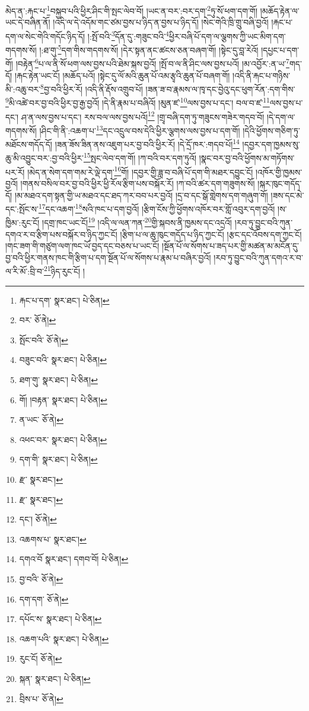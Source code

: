 མེད་ན་:རྐང་པ་\footnote{རྐང་པ་དག་  སྣར་ཐང་།  པེ་ཅིན། }བསྐྱབ་པའི་ཕྱིར་ཤིང་གི་སྤང་ལེབ་བོ། །ཡང་ན་བར་:བར་དག་\footnote{བར་  ཅོ་ནེ། }ཏུ་སོ་ཕག་དག་གོ། །མཆོད་རྟེན་ལ་ཡང་དེ་བཞིན་ནོ། །འདི་ལ་དེ་འདོམ་གང་ཙམ་བྱས་པ་ཉིད་ན་བྱས་པ་ཉིད་དོ། །སེང་གེའི་ཁྲི་གྲུ་བཞི་བྱའོ། །རྐང་པ་དག་ལ་སེང་གེའི་གདོང་ཉིད་དོ། །:སྤོ་བའི་\footnote{སྤོང་བའི་  ཅོ་ནེ། }དོན་དུ་:གཟུང་བའི་\footnote{བཟུང་བའི་  སྣར་ཐང་།  པེ་ཅིན། }ཕྱིར་བཞི་པོ་དག་ལ་ལྕགས་ཀྱི་ཡང་མིག་དག་གདགས་སོ། །:ཐ་གུ་\footnote{ཐག་གུ་  སྣར་ཐང་།  པེ་ཅིན། }དག་གིས་གདགས་སོ། །དེར་སྟན་ནང་ཚངས་ཅན་བཞག་གོ། །སྟེང་དུ་བླ་རེའོ། །དཔྱང་པ་དག་གོ། །བརྟེན་\footnote{གོ། །བརྟན་  སྣར་ཐང་།  པེ་ཅིན། }པ་ལ་ནི་སོ་ཕག་ལས་བྱས་པའི་ཐེམ་སྐས་བྱའོ། །སྤོ་བ་ལ་ནི་ཤིང་ལས་བྱས་པའོ། །མ་འབྱོར་:ན་ཡ་\footnote{ན་ཡང་  ཅོ་ནེ། }གད་དོ། །རྐང་རྟེན་ཡང་ངོ། །མཆོད་པའོ། །སྟེང་དུ་ལོ་མའི་ཆུན་པོ་འམ་རྩྭའི་ཆུན་པོ་བཞག་གོ། །འདི་ནི་རྐང་པ་གཉིས་མི་:འཆུ་བར་\footnote{འཕང་བར་  སྣར་ཐང་།  པེ་ཅིན། }བྱ་བའི་ཕྱིར་རོ། །འདི་ནི་རྡོས་འགྲུབ་པོ། །ཟན་ཟ་བ་རྣམས་ལ་ཁྭ་དང་བྱེའུ་དང་ཕུག་རོན་:དག་གིས་\footnote{དག་གི་  སྣར་ཐང་།  པེ་ཅིན། }མི་འཚེ་བར་བྱ་བའི་ཕྱིར་བྱ་རྒྱ་བྱའོ། །དེ་ནི་རྣམ་པ་བཞིའོ། །མུན་ཛ་\footnote{རྫ་  སྣར་ཐང་། }ལས་བྱས་པ་དང་། བལ་བ་ཛ་\footnote{རྫ་  སྣར་ཐང་། }ལས་བྱས་པ་དང་། ཤ་ན་ལས་བྱས་པ་དང་། རས་བལ་ལས་བྱས་པའོ།\footnote{དང་།  ཅོ་ནེ། } །གྲྭ་བཞི་དག་ཏུ་གཟུངས་གཟེར་གདབ་བོ། །དེ་དག་ལ་གདགས་སོ། །ཤིང་གི་ནི་:འཆག་པ་\footnote{འཆགས་པ་  སྣར་ཐང་། }དང་འདྲུལ་བས་དེའི་ཕྱིར་ལྕགས་ལས་བྱས་པ་དག་གོ། །དེའི་ཕྱོགས་གཅིག་ཏུ་མཐོངས་གདོད་དོ། །ཟན་ཟོས་ཟིན་ནས་འཇུག་པར་བྱ་བའི་ཕྱིར་རོ། །དེ་དྲོ་ཁར་:གདབ་པོ།\footnote{དགའ་བོ  སྣར་ཐང་། དགབ་བོ།  པེ་ཅིན། } །དབྱར་དག་ཁྱམས་སུ་ཆུ་མི་འབྱུང་བར་:བྱ་བའི་ཕྱིར་\footnote{བྱ་བའི་  ཅོ་ནེ། }སྤང་ལེབ་དག་གོ། །ཀ་བའི་བར་དག་ཏུའོ། །སྣང་བར་བྱ་བའི་ཕྱོགས་མ་གཏོགས་པར་རོ། །མེད་ན་སེག་དག་གམ་རེ་ལྡེ་དག་\footnote{དག་དག་  ཅོ་ནེ། }གོ། །དབྱར་གྱི་ཟླ་བ་བཞི་པོ་དག་གི་མཐར་དབྱུང་ངོ། །འཁོར་གྱི་ཁྱམས་བྱའོ། །གནས་བསིལ་བར་བྱ་བའི་ཕྱིར་ཕྱི་རོལ་རྩིག་པས་བསྐོར་རོ། །ཀ་བའི་ཚར་དག་གཟུགས་སོ། །སྐར་ཁུང་གདོད་དོ། །མ་མཐའ་དག་སྟན་གྱི་ཡ་མཐའ་དང་ཐད་ཀར་བབ་པར་བྱའོ། །དྲ་བ་དང་སྒོ་གླེགས་དག་གཞུག་གོ། །ཟས་དང་མེ་དང་:སྤོང་ས་\footnote{དཔོང་ས་  སྣར་ཐང་།  པེ་ཅིན། }དང་འཆག་\footnote{འཆག་པའི་  སྣར་ཐང་།  པེ་ཅིན། }སའི་ཁང་པ་དག་བྱའོ། །རྩིག་ངོས་ཀྱི་ཕྱོགས་འཁོར་བར་གློ་འབུར་དག་བྱའོ། །ས་ཁྱིམ་:རུང་ངོ། །དགྲ་ཁང་ཡང་ངོ།\footnote{རུང་ངོ།  ཅོ་ནེ། } །འདི་ལ་ལན་ཀན་\footnote{སྐན་  སྣར་ཐང་།  པེ་ཅིན། }གྱི་སྐབས་ནི་ཁྱམས་དང་འདྲའོ། །རབ་ཏུ་བྱུང་བའི་ཀུན་དགའ་ར་བ་རྩིག་པས་བསྐོར་བ་ཉིད་ཀྱང་ངོ། །རྩིག་པ་ལ་ཆུ་ཁུང་གདོད་པ་ཉིད་ཀྱང་ངོ། །རྩང་དང་འོབས་དག་ཀྱང་ངོ། །གང་ཟག་གི་གཙུག་ལག་ཁང་ཡོ་བྱད་དང་བཅས་པ་ཡང་ངོ། །སྔོན་པོ་ལ་སོགས་པ་ཟད་པར་གྱི་མཚན་མ་མངོན་དུ་བྱ་བའི་ཕྱིར་གནས་ཁང་གི་རྩིག་པ་དག་སྔོན་པོ་ལ་སོགས་པ་རྣམ་པ་བཞིར་བྱའོ། །རབ་ཏུ་བྱུང་བའི་ཀུན་དགའ་ར་བ་ལ་རི་མོ་:བྲི་བ་\footnote{བྲིས་པ་  ཅོ་ནེ། }ཉིད་རུང་ངོ། །

